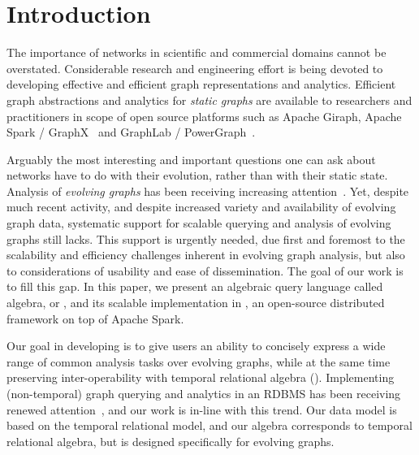 \section{Introduction}
\label{sec:intro}

The importance of networks in scientific and commercial domains cannot
be overstated.  Considerable research and engineering effort is being
devoted to developing effective and efficient graph representations
and analytics.  Efficient graph abstractions and analytics for {\em
  static graphs} are available to researchers and practitioners in
scope of open source platforms such as Apache Giraph, Apache Spark /
GraphX~\cite{DBLP:conf/osdi/GonzalezXDCFS14} and GraphLab /
PowerGraph~\cite{DBLP:conf/osdi/GonzalezLGBG12}.

Arguably the most interesting and important questions one can ask
about networks have to do with their evolution, rather than with their
static state.  Analysis of {\em evolving graphs} has been receiving
increasing
attention~\cite{DBLP:journals/csur/AggarwalS14,Chan2008,Kan2009,Miao2015,Ren2011,Semertzidis2015}.
Yet, despite much recent activity, and despite increased variety and
availability of evolving graph data, systematic support for scalable
querying and analysis of evolving graphs still lacks.  This support is
urgently needed, due first and foremost to the scalability and
efficiency challenges inherent in evolving graph analysis, but also to
considerations of usability and ease of dissemination.  The goal of
our work is to fill this gap.  In this paper, we present an algebraic
query language called \tg algebra, or \tga, and its scalable
implementation in \ql, an open-source distributed framework on top of
Apache Spark.

Our goal in developing \tga is to give users an ability to concisely
express a wide range of common analysis tasks over evolving graphs,
while at the same time preserving inter-operability with temporal
relational algebra (\tra).  Implementing (non-temporal) graph querying
and analytics in an RDBMS has been receiving renewed
attention~\cite{DBLP:conf/sigmod/AbergerTOR16,DBLP:conf/sigmod/SunFSKHX15,DBLP:journals/pvldb/Xirogiannopoulos15},
and our work is in-line with this trend. Our data model is based on
the temporal relational model, and our algebra corresponds to temporal
relational algebra, but is designed specifically for evolving graphs.


